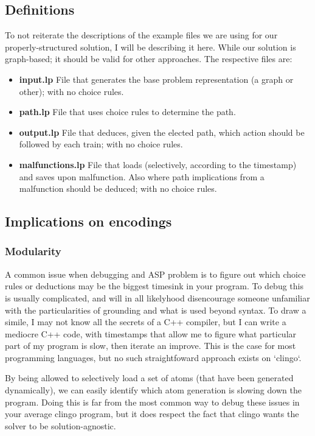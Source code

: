 \documentclass[runningheads]{llncs}
\begin{document}
\subsection{Definitions}
To not reiterate the descriptions of the example files we are using for our properly-structured solution, I will be describing it here. While our solution is graph-based; it should be valid for other approaches. The respective files are:
\begin{itemize}
	\item  \textbf{input.lp} File that generates the base problem representation (a graph or other); with no choice rules.
	\item  \textbf{path.lp} File that uses choice rules to determine the path.
	\item  \textbf{output.lp} File that deduces, given the elected path, which action should be followed by each train; with no choice rules.
	\item  \textbf{malfunctions.lp} File that loads (selectively, according to the timestamp) and saves upon malfunction. Also where path implications from a malfunction should be deduced; with no choice rules.

\end{itemize}




\subsection{Implications on encodings}

\subsubsection{Modularity}
A common issue when debugging and ASP problem is to figure out which choice rules or deductions may be the biggest timesink in your program. To debug this is usually complicated, and will in all likelyhood disencourage someone unfamiliar with the particularities of grounding and what is used beyond syntax. To draw a simile, I may not know all the secrets of a C++ compiler, but I can write a mediocre C++ code, with timestamps that allow me to figure what particular part of my program is slow, then iterate an improve. This is the case for most programming languages, but no such straightfoward approach exists on `clingo`.

By being allowed to selectively load a set of atoms (that have been generated dynamically), we can easily identify which atom generation is slowing down the program. Doing this is far from the most common way to debug these issues in your average clingo program, but it does respect the fact that clingo wants the solver to be solution-agnostic. 
\end{document}
